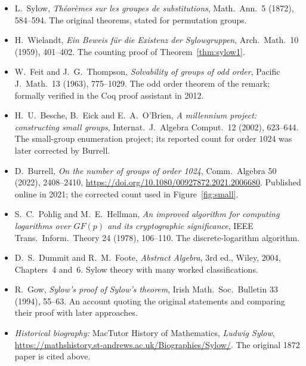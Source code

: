 \begin{itemize}
\item L.~Sylow, \emph{Th\'eor\`emes sur les groupes de substitutions}, Math.\ Ann.\ 5 (1872), 584--594. The original theorems, stated for permutation groups.
\item H.~Wielandt, \emph{Ein Beweis f\"ur die Existenz der Sylowgruppen}, Arch.\ Math.\ 10 (1959), 401--402. The counting proof of Theorem~\ref{thm:sylow1}.
\item W.~Feit and J.~G.~Thompson, \emph{Solvability of groups of odd order}, Pacific J.\ Math.\ 13 (1963), 775--1029. The odd order theorem of the remark; formally verified in the Coq proof assistant in 2012.
\item H.~U.~Besche, B.~Eick and E.~A.~O'Brien, \emph{A millennium project: constructing small groups}, Internat.\ J.\ Algebra Comput.\ 12 (2002), 623--644. The small-group enumeration project; its reported count for order $1024$ was later corrected by Burrell.
\item D.~Burrell, \emph{On the number of groups of order 1024}, Comm.\ Algebra 50 (2022), 2408--2410, \url{https://doi.org/10.1080/00927872.2021.2006680}. Published online in 2021; the corrected count used in Figure~\ref{fig:small}.
\item S.~C.~Pohlig and M.~E.~Hellman, \emph{An improved algorithm for computing logarithms over $GF(p)$ and its cryptographic significance}, IEEE Trans.\ Inform.\ Theory 24 (1978), 106--110. The discrete-logarithm algorithm.
\item D.~S.~Dummit and R.~M.~Foote, \emph{Abstract Algebra}, 3rd ed., Wiley, 2004, Chapters~4 and~6. Sylow theory with many worked classifications.
\item R.~Gow, \emph{Sylow's proof of Sylow's theorem}, Irish Math.\ Soc.\ Bulletin 33 (1994), 55--63. An account quoting the original statements and comparing their proof with later approaches.
\item \emph{Historical biography:} MacTutor History of Mathematics, \emph{Ludwig Sylow}, \url{https://mathshistory.st-andrews.ac.uk/Biographies/Sylow/}. The original 1872 paper is cited above.
\end{itemize}
